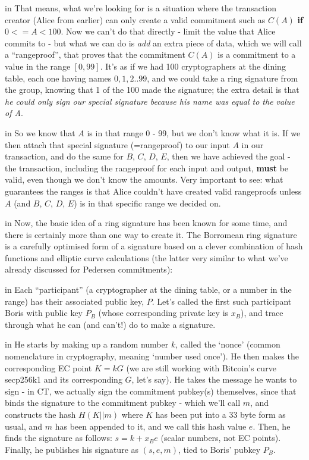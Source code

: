 \documentclass[10pt,a4paper]{article}
\begin{document}
 in \noindent That means, what we're looking for is a situation where the transaction creator (Alice from earlier) can only create a valid commitment such as $C(A)$ \textbf{if} $0 <= A < 100$. Now we can't do that directly - limit the value that Alice commits to - but what we can do is \textit{add} an extra piece of data, which we will call a ``rangeproof'', that proves that the commitment $C(A)$ is a commitment to a value in the range $[0,99]$. It's as if we had 100 cryptographers at the dining table, each one having names $0,1,2..99$, and we could take a ring signature from the group, knowing that 1 of the 100 made the signature; the extra detail is that \textit{he could only sign our special signature because his name was equal to the value of A}.

 in \noindent So we know that $A$ is in that range 0 - 99, but we don't know what it is. If we then attach that special signature (=rangeproof) to our input $A$ in our transaction, and do the same for $B$, $C$, $D$, $E$, then we have achieved the goal - the transaction, including the rangeproof for each input and output, \textbf{must} be valid, even though we don't know the amounts. Very important to see: what guarantees the ranges is that Alice couldn't have created valid rangeproofs unless $A$ (and $B$, $C$, $D$, $E$) is in that specific range we decided on.

 in \noindent Now, the basic idea of a ring signature has been known for some time, and there is certainly more than one way to create it. The Borromean ring signature \cite{borromean} is a carefully optimised form of a signature based on a clever combination of hash functions and elliptic curve calculations (the latter very similar to what we've already discussed for Pedersen commitments):

 in \noindent Each ``participant'' (a cryptographer at the dining table, or a number in the range) has their associated public key, $P$. Let's called the first such participant Boris with public key $P_B$ (whose corresponding private key is $x_B$), and trace through what he can (and can't!) do to make a signature.

 in \noindent He starts by making up a random number $k$, called the `nonce' (common nomenclature in cryptography, meaning `number used once'). He then makes the corresponding EC point $K = kG$ (we are still working with Bitcoin's curve secp256k1 and its corresponding $G$, let's say). He takes the message he wants to sign - in CT, we actually sign the commitment pubkey(s) themselves, since that binds the signature to the commitment pubkey - which we'll call $m$, and constructs the hash $H(K||m)$ where $K$ has been put into a 33 byte form as usual, and $m$ has been appended to it, and we call this hash value $e$. Then, he finds the signature as follows: $s = k + x_{B}e$ (scalar numbers, not EC points). Finally, he publishes his signature as $(s,e,m)$, tied to Boris' pubkey $P_B$.
\end{document}

